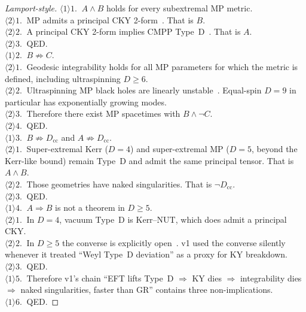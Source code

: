 \documentclass[11pt,a4paper]{article}
\begin{document}
\begin{proof}[Lamport-style]
\(\langle1\rangle1.\ \) \(A\wedge B\) holds for every subextremal MP
metric.\\
\quad\(\langle2\rangle1.\ \) MP admits a principal CKY
2-form~\cite{FrolovKubiznak2007}. That is \(B\).\\
\quad\(\langle2\rangle2.\ \) A principal CKY 2-form implies CMPP
Type~D~\cite{FrolovKrtousKubiznak2017}. That is \(A\).\\
\quad\(\langle2\rangle3.\ \) QED.\\
\(\langle1\rangle2.\ \) \(B\not\Rightarrow C\).\\
\quad\(\langle2\rangle1.\ \) Geodesic integrability holds for all MP
parameters for which the metric is defined, including ultraspinning
\(D\ge6\).\\
\quad\(\langle2\rangle2.\ \) Ultraspinning MP black holes are linearly
unstable~\cite{EmparanMyers2003,Diasetal2010,DiasFiguerasMonteiroSantos2010}.
Equal-spin \(D=9\) in particular has exponentially growing modes.\\
\quad\(\langle2\rangle3.\ \) Therefore there exist MP spacetimes with
\(B\wedge\neg C\).\\
\quad\(\langle2\rangle4.\ \) QED.\\
\(\langle1\rangle3.\ \) \(B\not\Rightarrow D_{\mathrm{cc}}\) and
\(A\not\Rightarrow D_{\mathrm{cc}}\).\\
\quad\(\langle2\rangle1.\ \) Super-extremal Kerr (\(D=4\)) and
super-extremal MP (\(D=5\), beyond the Kerr-like bound) remain Type~D
and admit the same principal tensor. That is \(A\wedge B\).\\
\quad\(\langle2\rangle2.\ \) Those geometries have naked singularities.
That is \(\neg D_{\mathrm{cc}}\).\\
\quad\(\langle2\rangle3.\ \) QED.\\
\(\langle1\rangle4.\ \) \(A\Rightarrow B\) is not a theorem in
\(D\ge5\).\\
\quad\(\langle2\rangle1.\ \) In \(D=4\), vacuum Type~D is Kerr--NUT,
which does admit a principal CKY.\\
\quad\(\langle2\rangle2.\ \) In \(D\ge5\) the converse is explicitly
open~\cite{FrolovKrtousKubiznak2017}. v1 used the converse silently
whenever it treated ``Weyl Type~D deviation'' as a proxy for KY
breakdown.\\
\quad\(\langle2\rangle3.\ \) QED.\\
\(\langle1\rangle5.\ \) Therefore v1's chain ``EFT lifts Type~D
\(\Rightarrow\) KY dies \(\Rightarrow\) integrability dies
\(\Rightarrow\) naked singularities, faster than GR'' contains three
non-implications.\\
\(\langle1\rangle6.\ \) QED.
\end{proof}
\end{document}
